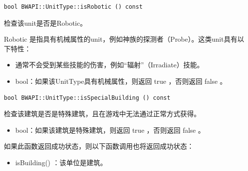 \begin{tcolorbox}[colback=white, colframe=black!60!white, title=isRobotic(), arc=0mm]
    \begin{verbatim}
bool BWAPI::UnitType::isRobotic () const
    \end{verbatim}
    检查该unit是否是Robotic。\par Robotic 是指具有机械属性的unit，例如神族的探测者（Probe）。这类unit具有以下特性：
    \begin{itemize}
        \item 通常不会受到某些技能的伤害，例如“辐射”（Irradiate）技能。
    \end{itemize}
\begin{return}
\begin{itemize}
    \item bool：如果该UnitType具有机械属性，则返回   true  ，否则返回   false  。
\end{itemize}
\end{return}
\end{tcolorbox}


\begin{tcolorbox}[colback=white, colframe=black!60!white, title=isSpecialBuilding(), arc=0mm]
    \begin{verbatim}
bool BWAPI::UnitType::isSpecialBuilding () const
    \end{verbatim}
    检查该建筑是否是特殊建筑，且在游戏中无法通过正常方式获得。
\begin{return}
\begin{itemize}
    \item bool：如果该建筑是特殊建筑，则返回   true  ，否则返回   false  。
\end{itemize}
\end{return}
\begin{note}
    如果此函数返回成功状态，则以下函数调用也将返回成功状态：
    \begin{itemize}
        \item isBuilding()  ：该单位是建筑。
    \end{itemize}
\end{note}
\end{tcolorbox}


